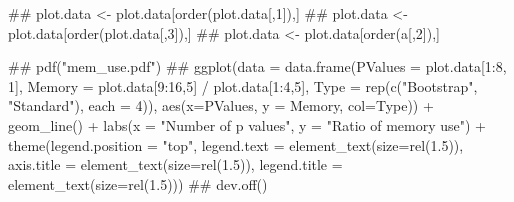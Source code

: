 \documentclass{amsart}
\begin{document}
## plot.data <- plot.data[order(plot.data[,1]),]
## plot.data <- plot.data[order(plot.data[,3]),]
## plot.data <- plot.data[order(a[,2]),]

## pdf("mem_use.pdf")
## ggplot(data = data.frame(PValues = plot.data[1:8, 1], Memory = plot.data[9:16,5] / plot.data[1:4,5],
                            Type = rep(c("Bootstrap", "Standard"), each = 4)),
          aes(x=PValues, y = Memory, col=Type)) +
          geom_line() +
          labs(x = "Number of p values", y = "Ratio of memory use") +
          theme(legend.position = "top", legend.text = element_text(size=rel(1.5)),
                axis.title = element_text(size=rel(1.5)),
                legend.title = element_text(size=rel(1.5)))
## dev.off()


\fi
\end{document}
